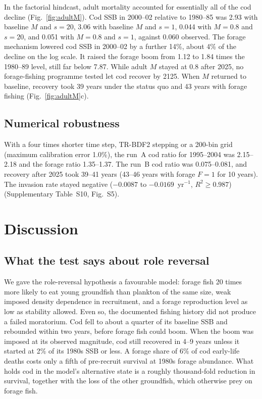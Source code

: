 \documentclass[12pt,letterpaper,fleqn]{article}
\newcommand{\yr}{yr$^{-1}$}
\begin{document}
In the factorial hindcast, adult mortality accounted for essentially all of the cod decline (Fig.~\ref{fig:adultM}). Cod SSB in 2000--02 relative to 1980--85 was 2.93 with baseline $M$ and $s=20$, 3.06 with baseline $M$ and $s=1$, 0.044 with $M=0.8$ and $s=20$, and 0.051 with $M=0.8$ and $s=1$, against 0.060 observed. The forage mechanism lowered cod SSB in 2000--02 by a further 14\%, about 4\% of the decline on the log scale. It raised the forage boom from 1.12 to 1.84 times the 1980--89 level, still far below 7.87. While adult $M$ stayed at 0.8 after 2025, no forage-fishing programme tested let cod recover by 2125. When $M$ returned to baseline, recovery took 39 years under the status quo and 43 years with forage fishing (Fig.~\ref{fig:adultM}c).

\subsection{Numerical robustness}

With a four times shorter time step, TR-BDF2 stepping or a 200-bin grid (maximum calibration error 1.0\%), the run~A cod ratio for 1995--2004 was 2.15--2.18 and the forage ratio 1.35--1.37. The run~B cod ratio was 0.075--0.081, and recovery after 2025 took 39--41 years (43--46 years with forage $F=1$ for 10 years). The invasion rate stayed negative ($-0.0087$ to $-0.0169$~\yr{}, $R^{2}\geq0.987$) (Supplementary Table~S10, Fig.~S5).

\section{Discussion}

\subsection{What the test says about role reversal}

We gave the role-reversal hypothesis a favourable model: forage fish 20 times more likely to eat young groundfish than plankton of the same size, weak imposed density dependence in recruitment, and a forage reproduction level as low as stability allowed. Even so, the documented fishing history did not produce a failed moratorium. Cod fell to about a quarter of its baseline SSB and rebounded within two years, before forage fish could boom. When the boom was imposed at its observed magnitude, cod still recovered in 4--9 years unless it started at 2\% of its 1980s SSB or less. A forage share of 6\% of cod early-life deaths costs only a fifth of pre-recruit survival at 1980s forage abundance. What holds cod in the model's alternative state is a roughly thousand-fold reduction in survival, together with the loss of the other groundfish, which otherwise prey on forage fish.
\end{document}
